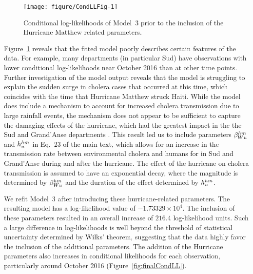 \begin{figure}[!ht]
\begin{knitrout}
\color{fgcolor}
\texttt{[image: figure/CondLLFig-1]} 
\end{knitrout}
\caption[Conditional log-likelihoods without hurricane adjustment]{\label{fig:condLL}Conditional log-likelihoods of Model~3 prior to the inclusion of the Hurricane Matthew related parameters.}
\end{figure}

Figure~\ref{fig:condLL} reveals that the fitted model poorly describes certain features of the data.
For example, many departments (in particular Sud) have observations with lower conditional log-likelihoods near October 2016 than at other time points.
Further investigation of the model output reveals that the model is struggling to explain the sudden surge in cholera cases that occurred at this time, which coincides with the time that Hurricane Matthew struck Haiti.
While the model does include a mechanism to account for increased cholera transmission due to large rainfall events, the mechanism does not appear to be sufficient to capture the damaging effects of the hurricane, which had the greatest impact in the the Sud and Grand'Anse departments \cite{ferreirai16}.
This result led us to include parameters $\beta_{Wu}^{hm}$ and $h_{u}^{hm}$ in Eq.~23 of the main text, which allows for an increase in the transmission rate between environmental cholera and humans for in Sud and Grand'Anse during and after the hurricane.
The effect of the hurricane on cholera transmission is assumed to have an exponential decay, where the magnitude is determined by $\beta_{Wu}^{hm}$ and the duration of the effect determined by $h_{u}^{hm}$.



We refit Model~3 after introducing these hurricane-related parameters.
The resulting model has a log-likelihood value of $\ensuremath{-1.73329\times 10^{4}}$.
The inclusion of these parameters resulted in an overall increase of $216.4$ log-likelihood units.
Such a large difference in log-likelihoods is well beyond the threshold of statistical uncertainty determined by Wilks' theorem, suggesting that the data highly favor the inclusion of the additional parameters.
The addition of the Hurricane parameters also increases in conditional likelihoods for each observation, particularly around October 2016 (Figure~\ref{fig:finalCondLL}).



